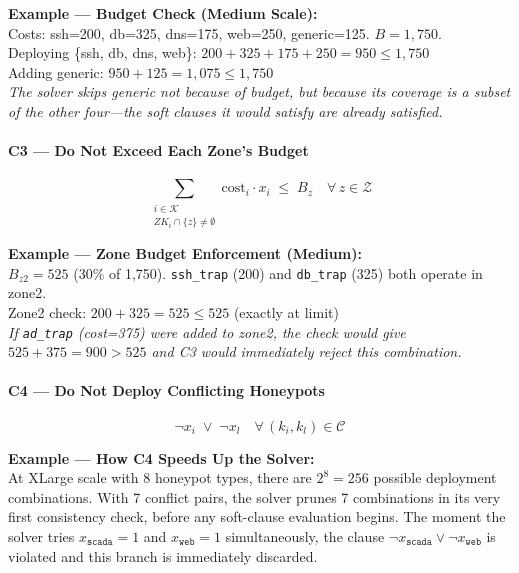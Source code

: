 \documentclass[journal]{IEEEtran}
\newcommand{\calK}{\mathcal{K}}
\newcommand{\calZ}{\mathcal{Z}}
\newcommand{\calC}{\mathcal{C}}
\begin{document}
\begin{examplebox}
\textbf{Example --- Budget Check (Medium Scale):}\\[3pt]
Costs: ssh=200, db=325, dns=175, web=250, generic=125.
$B=1{,}750$.\\
Deploying \{ssh, db, dns, web\}:
$200+325+175+250=950 \leq 1{,}750$ \checkmark\\
Adding generic: $950+125=1{,}075 \leq 1{,}750$ \checkmark\\
\textit{The solver skips generic not because of budget, but
because its coverage is a subset of the other four---the
soft clauses it would satisfy are already satisfied.}
\end{examplebox}

\paragraph{C3 --- Do Not Exceed Each Zone's Budget}
\begin{equation}
  \sum_{\substack{i \in \calK \\ ZK_i \cap \{z\} \neq \emptyset}}
  \mathrm{cost}_i \cdot x_i \;\leq\; B_z
  \quad \forall\, z \in \calZ
\end{equation}

\begin{examplebox}
\textbf{Example --- Zone Budget Enforcement (Medium):}\\[3pt]
$B_{z2}=525$ (30\% of 1,750). \texttt{ssh\_trap} (200) and
\texttt{db\_trap} (325) both operate in zone2.\\
Zone2 check: $200+325=525 \leq 525$ \checkmark (exactly at limit)\\
\textit{If \texttt{ad\_trap} (cost=375) were added to zone2,
the check would give $525+375=900 > 525$ and C3 would
immediately reject this combination.}
\end{examplebox}

\paragraph{C4 --- Do Not Deploy Conflicting Honeypots}
\begin{equation}
  \neg x_i \;\vee\; \neg x_l
  \quad \forall\,(k_i,k_l) \in \calC
\end{equation}

\begin{examplebox}
\textbf{Example --- How C4 Speeds Up the Solver:}\\[3pt]
At XLarge scale with 8 honeypot types, there are
$2^8=256$ possible deployment combinations.
With 7 conflict pairs, the solver prunes 7 combinations
in its very first consistency check, before any
soft-clause evaluation begins.
The moment the solver tries
$x_{\texttt{scada}}=1$ and $x_{\texttt{web}}=1$
simultaneously, the clause
$\neg x_{\texttt{scada}} \vee \neg x_{\texttt{web}}$
is violated and this branch is immediately discarded.
\end{examplebox}
\end{document}

